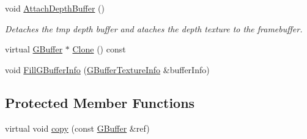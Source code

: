 \begin{DoxyCompactItemize}
void \mbox{\hyperlink{class_geometry_engine_1_1_geometry_buffer_1_1_g_buffer_a5101a82324f81ed73a1380d1ac97ce7f}{Attach\+Depth\+Buffer}} ()
\begin{DoxyCompactList}\small\item\em Detaches the tmp depth buffer and ataches the depth texture to the framebuffer. \end{DoxyCompactList}\item 
virtual \mbox{\hyperlink{class_geometry_engine_1_1_geometry_buffer_1_1_g_buffer}{G\+Buffer}} $\ast$ \mbox{\hyperlink{class_geometry_engine_1_1_geometry_buffer_1_1_g_buffer_af993f8c23f7e78051f3071be4873af9d}{Clone}} () const
\item 
void \mbox{\hyperlink{class_geometry_engine_1_1_geometry_buffer_1_1_g_buffer_ad1242e69d277b69b58497f7d489e176c}{Fill\+G\+Buffer\+Info}} (\mbox{\hyperlink{struct_geometry_engine_1_1_g_buffer_texture_info}{G\+Buffer\+Texture\+Info}} \&buffer\+Info)
\end{DoxyCompactItemize}
\subsection*{Protected Member Functions}
\begin{DoxyCompactItemize}
\item 
virtual void \mbox{\hyperlink{class_geometry_engine_1_1_geometry_buffer_1_1_g_buffer_a9f20eb78703ef048d59a54f90ee09f25}{copy}} (const \mbox{\hyperlink{class_geometry_engine_1_1_geometry_buffer_1_1_g_buffer}{G\+Buffer}} \&ref)
\end{DoxyCompactItemize}
